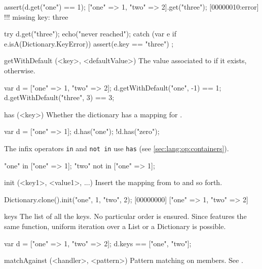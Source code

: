 \begin{urbiscriptapi}
\begin{urbiscript}
assert(d.get("one") == 1);
["one" => 1, "two" => 2].get("three");
[00000010:error] !!! missing key: three

try
{
  d.get("three");
  echo("never reached");
}
catch (var e if e.isA(Dictionary.KeyError))
{
  assert(e.key == "three")
};
\end{urbiscript}


\item[getWithDefault](<key>, <defaultValue>)%
  The value associated to  if it exists, 
  otherwise.

\begin{urbiassert}
var d = ["one" => 1, "two" => 2];
d.getWithDefault("one",  -1) == 1;
d.getWithDefault("three", 3) == 3;
\end{urbiassert}


\item[has](<key>)%
  Whether the dictionary has a mapping for .

\begin{urbiassert}
var d = ["one" => 1];
d.has("one");
!d.has("zero");
\end{urbiassert}

  The infix operators \lstinline|in| and \lstinline|not in| use
  \lstinline|has| (see \autoref{sec:lang:op:containers}).

\begin{urbiassert}
"one" in     ["one" => 1];
"two" not in ["one" => 1];
\end{urbiassert}


\item[init](<key1>, <value1>, ...)%
  Insert the mapping from  to  and so forth.

\begin{urbiscript}
Dictionary.clone().init("one", 1, "two", 2);
[00000000] ["one" => 1, "two" => 2]
\end{urbiscript}


\item[keys]%
  The list of all the keys.  No particular order is ensured.  Since
   features the same function, uniform iteration over
  a List or a Dictionary is possible.
\begin{urbiassert}
var d = ["one" => 1, "two" => 2];
d.keys == ["one", "two"];
\end{urbiassert}


\item[matchAgainst](<handler>, <pattern>)
  Pattern matching on members.  See .


\end{urbiscriptapi}
